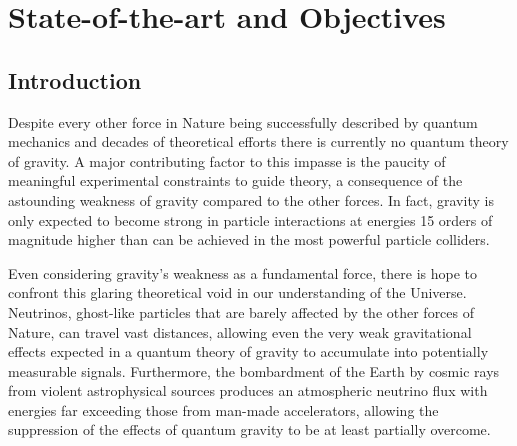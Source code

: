 \documentclass[a4paper,11pt]{article}
\newcounter{bar}
\begin{document}

\section{State-of-the-art and Objectives}
\vspace{0.1 cm}


\subsection{Introduction}

Despite every other force in Nature being successfully described by quantum mechanics and decades of theoretical efforts there is currently no quantum theory of gravity. A major contributing factor to this impasse is the paucity of meaningful experimental constraints to guide theory, a consequence of the astounding weakness of gravity compared to the other forces. In fact, gravity is only expected to become strong in particle interactions at energies 15 orders of magnitude higher than can be achieved in the most powerful particle colliders.

Even considering gravity's weakness as a fundamental force, there is hope to confront this glaring theoretical void in our understanding of the Universe. Neutrinos, ghost-like particles that are barely affected by the other forces of Nature, can travel vast distances, allowing even the very weak gravitational effects expected in a quantum theory of gravity to accumulate into potentially measurable signals. Furthermore, the bombardment of the Earth by cosmic rays from violent astrophysical sources produces an atmospheric neutrino flux with energies far exceeding those from man-made accelerators, allowing the suppression of the effects of quantum gravity to be at least partially overcome.
\end{document}
